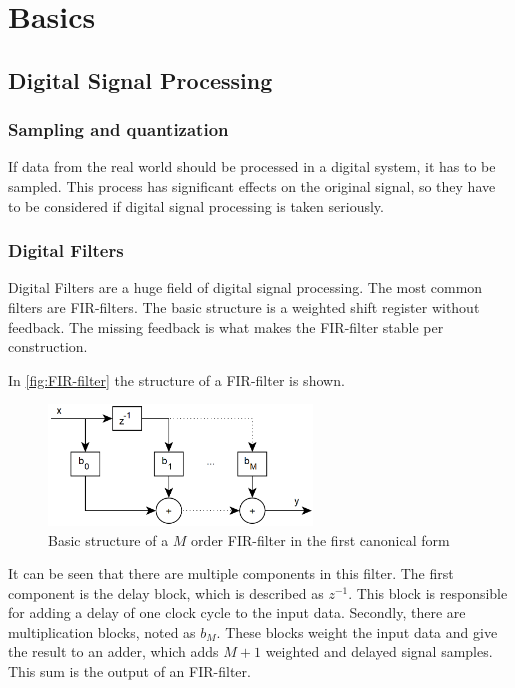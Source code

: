 \section{Basics}

\subsection{Digital Signal Processing}

\subsubsection{Sampling and quantization}

If data from the real world should be processed in a digital system, it has to be sampled.
This process has significant effects on the original signal, so they have to be considered if
digital signal processing is taken seriously.


\subsubsection{Digital Filters}


Digital Filters are a huge field of digital signal processing. The most common filters are \ac{FIR}-filters.
The basic structure is a weighted shift register without feedback. The missing feedback is what makes
the \ac{FIR}-filter stable per construction.

In \autoref{fig:FIR-filter} the structure of a \ac{FIR}-filter is shown.

\begin{figure}[!h]
    \centering
    \includegraphics[width=7cm]{img/fir.png}
    \caption{Basic structure of a $M$ order \ac{FIR}-filter in the first canonical form \cite{meyer_signalverarbeitung}}
    \label{fig:FIR-filter}
\end{figure}

It can be seen that there are multiple components in this filter. The first component is the delay block,
which is described as $z^{-1}$. This block is responsible for adding a delay of one clock cycle to the input data.
Secondly, there are multiplication blocks, noted as $b_M$. These blocks weight the input data and give the
result to an adder, which adds $M+1$ weighted and delayed signal samples. This sum is the output of an
\ac{FIR}-filter.

